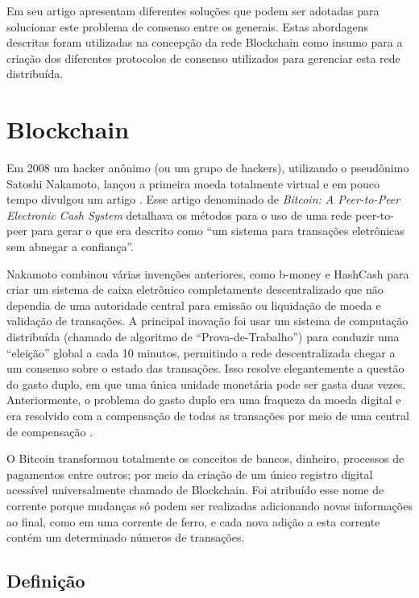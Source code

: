             Em seu artigo  apresentam diferentes soluções que podem ser adotadas para solucionar este problema de consenso entre os generais. Estas abordagens descritas foram utilizadas na concepção da rede Blockchain como insumo para a criação dos diferentes protocolos de consenso utilizados para gerenciar esta rede distribuída.   
    
    
   
\section{Blockchain}

    
    Em 2008 um hacker anônimo (ou um grupo de hackers), utilizando o pseudônimo Satoshi Nakamoto, lançou a primeira moeda totalmente virtual e em pouco tempo divulgou um artigo \cite{bitcoin_satoshi}. Esse artigo denominado de \textit{Bitcoin: A Peer-to-Peer Electronic Cash System} detalhava os métodos para o uso de uma rede peer-to-peer para gerar o que era descrito como “um sistema para transações eletrônicas sem abnegar a confiança”.
    
    Nakamoto combinou várias invenções anteriores, como b-money e HashCash para criar um sistema de caixa eletrônico completamente descentralizado que não dependia de uma autoridade central para emissão ou liquidação de moeda e validação de transações. A principal inovação foi usar um sistema de computação distribuída (chamado de algoritmo de “Prova-de-Trabalho”) para conduzir uma “eleição” global a cada 10 minutos, permitindo a rede descentralizada chegar a um consenso sobre o estado das transações. Isso resolve elegantemente a questão do gasto duplo, em que uma única unidade monetária pode ser gasta duas vezes. Anteriormente, o problema do gasto duplo era uma fraqueza da moeda digital e era resolvido com a compensação de todas as transações por meio de uma central de compensação \cite{mastering_blockchain_andreas}.
    
    O Bitcoin transformou totalmente os conceitos de bancos, dinheiro, processos de pagamentos entre outros; por meio da criação de um único registro digital acessível universalmente chamado de Blockchain. Foi atribuído esse nome de corrente porque mudanças só podem ser realizadas adicionando novas informações ao final, como em uma corrente de ferro, e cada nova adição a esta corrente contém um determinado números de transações.



    \subsection{Definição}
    
